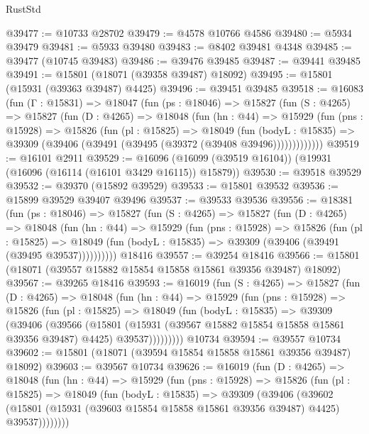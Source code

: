 \begin{lexlean}{RustStd}
\begin{coremodule}
@39477 := @10733 @28702
@39479 := @4578 @10766 @4586
@39480 := @5934 @39479
@39481 := @5933 @39480
@39483 := @8402 @39481 @4348
@39485 := @39477 (@10745 @39483)
@39486 := @39476 @39485
@39487 := @39441 @39485
@39491 := @15801 (@18071 (@39358 @39487) @18092)
@39495 := @15801 (@15931 (@39363 @39487) @4425)
@39496 := @39451 @39485
@39518 := @16083
    (fun (Γ : @15831) =>
    @18047
      (fun (ps : @18046) =>
      @15827
        (fun (S : @4265) =>
        @15827
          (fun (D : @4265) =>
          @18048
            (fun (hn : @44) =>
            @15929
              (fun (pns : @15928) =>
              @15826
                (fun (pl : @15825) =>
                @18049
                  (fun (bodyL : @15835) =>
                  @39309 (@39406 (@39491 (@39495 (@39372 (@39408 @39496)))))))))))))
@39519 := @16101 @2911
@39529 := @16096 (@16099 (@39519 @16104)) (@19931 (@16096 (@16114 (@16101 @3429 @16115)) @15879))
@39530 := @39518 @39529
@39532 := @39370 (@15892 @39529)
@39533 := @15801 @39532
@39536 := @15899 @39529 @39407 @39496
@39537 := @39533 @39536
@39556 := @18381
    (fun (ps : @18046) =>
    @15827
      (fun (S : @4265) =>
      @15827
        (fun (D : @4265) =>
        @18048
          (fun (hn : @44) =>
          @15929
            (fun (pns : @15928) =>
            @15826
              (fun (pl : @15825) =>
              @18049 (fun (bodyL : @15835) => @39309 (@39406 (@39491 (@39495 @39537))))))))))
    @18416
@39557 := @39254 @18416
@39566 := @15801 (@18071 (@39557 @15882 @15854 @15858 @15861 @39356 @39487) @18092)
@39567 := @39265 @18416
@39593 := @16019
    (fun (S : @4265) =>
    @15827
      (fun (D : @4265) =>
      @18048
        (fun (hn : @44) =>
        @15929
          (fun (pns : @15928) =>
          @15826
            (fun (pl : @15825) =>
            @18049
              (fun (bodyL : @15835) =>
              @39309
                (@39406
                  (@39566
                    (@15801
                      (@15931 (@39567 @15882 @15854 @15858 @15861 @39356 @39487) @4425)
                      @39537)))))))))
    @10734
@39594 := @39557 @10734
@39602 := @15801 (@18071 (@39594 @15854 @15858 @15861 @39356 @39487) @18092)
@39603 := @39567 @10734
@39626 := @16019
    (fun (D : @4265) =>
    @18048
      (fun (hn : @44) =>
      @15929
        (fun (pns : @15928) =>
        @15826
          (fun (pl : @15825) =>
          @18049
            (fun (bodyL : @15835) =>
            @39309
              (@39406
                (@39602
                  (@15801 (@15931 (@39603 @15854 @15858 @15861 @39356 @39487) @4425) @39537))))))))

\end{coremodule}
\end{lexlean}
